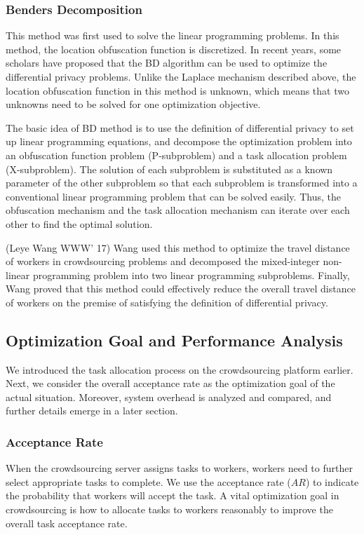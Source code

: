 \subsubsection{Benders Decomposition}
This method was first used to solve the linear programming problems. In this method, the location obfuscation function is discretized. In recent years, some scholars have proposed that the BD algorithm can be used to optimize the differential privacy problems. Unlike the Laplace mechanism described above, the location obfuscation function in this method is unknown, which means that two unknowns need to be solved for one optimization objective.

The basic idea of BD method is to use the definition of differential privacy to set up linear programming equations, and decompose the optimization problem into an obfuscation function problem (P-subproblem) and a task allocation problem (X-subproblem). The solution of each subproblem is substituted as a known parameter of the other subproblem so that each subproblem is transformed into a conventional linear programming problem that can be solved easily. Thus, the obfuscation mechanism and the task allocation mechanism can iterate over each other to find the optimal solution.

(Leye Wang WWW' 17) Wang used this method to optimize the travel distance of workers in crowdsourcing problems and decomposed the mixed-integer non-linear programming problem into two linear programming subproblems. Finally, Wang proved that this method could effectively reduce the overall travel distance of workers on the premise of satisfying the definition of differential privacy.

\subsection{Optimization Goal and Performance Analysis}
We introduced the task allocation process on the crowdsourcing platform earlier. Next, we consider the overall acceptance rate as the optimization goal of the actual situation. Moreover, system overhead is analyzed and compared, and further details emerge in a later section.

\subsubsection{Acceptance Rate}
When the crowdsourcing server assigns tasks to workers, workers need to further select appropriate tasks to complete. We use the acceptance rate ($AR$) to indicate the probability that workers will accept the task. A vital optimization goal in crowdsourcing is how to allocate tasks to workers reasonably to improve the overall task acceptance rate.

